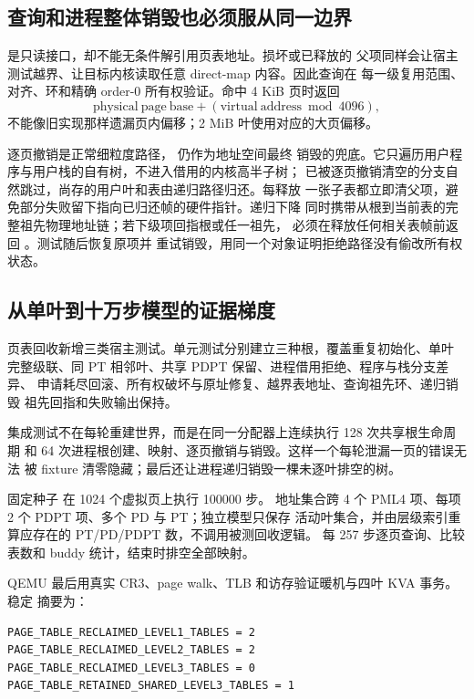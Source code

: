 \subsection{查询和进程整体销毁也必须服从同一边界}

 是只读接口，却不能无条件解引用页表地址。损坏或已释放的
父项同样会让宿主测试越界、让目标内核读取任意 direct-map 内容。因此查询在
每一级复用范围、对齐、环和精确 order-0 所有权验证。命中 4 KiB 页时返回
\[
  \mathrm{physical\ page\ base} + (\mathrm{virtual\ address}\bmod4096),
\]
不能像旧实现那样遗漏页内偏移；2 MiB 叶使用对应的大页偏移。

逐页撤销是正常细粒度路径， 仍作为地址空间最终
销毁的兜底。它只遍历用户程序与用户栈的自有树，不进入借用的内核高半子树；
已被逐页撤销清空的分支自然跳过，尚存的用户叶和表由递归路径归还。每释放
一张子表都立即清父项，避免部分失败留下指向已归还帧的硬件指针。递归下降
同时携带从根到当前表的完整祖先物理地址链；若下级项回指根或任一祖先，
必须在释放任何相关表帧前返回 。测试随后恢复原项并
重试销毁，用同一个对象证明拒绝路径没有偷改所有权状态。

\subsection{从单叶到十万步模型的证据梯度}

页表回收新增三类宿主测试。单元测试分别建立三种根，覆盖重复初始化、单叶
完整级联、同 PT 相邻叶、共享 PDPT 保留、进程借用拒绝、程序与栈分支差异、
申请耗尽回滚、所有权破坏与原址修复、越界表地址、查询祖先环、递归销毁
祖先回指和失败输出保持。

集成测试不在每轮重建世界，而是在同一分配器上连续执行 128 次共享根生命周期
和 64 次进程根创建、映射、逐页撤销与销毁。这样一个每轮泄漏一页的错误无法
被 fixture 清零隐藏；最后还让进程递归销毁一棵未逐叶排空的树。

固定种子  在 1024 个虚拟页上执行 100000 步。
地址集合跨 4 个 PML4 项、每项 2 个 PDPT 项、多个 PD 与 PT；独立模型只保存
活动叶集合，并由层级索引重算应存在的 PT/PD/PDPT 数，不调用被测回收逻辑。
每 257 步逐页查询、比较表数和 buddy 统计，结束时排空全部映射。

QEMU 最后用真实 CR3、page walk、TLB 和访存验证暖机与四叶 KVA 事务。稳定
摘要为：

\begin{verbatim}
PAGE_TABLE_RECLAIMED_LEVEL1_TABLES = 2
PAGE_TABLE_RECLAIMED_LEVEL2_TABLES = 2
PAGE_TABLE_RECLAIMED_LEVEL3_TABLES = 0
PAGE_TABLE_RETAINED_SHARED_LEVEL3_TABLES = 1
\end{verbatim}

